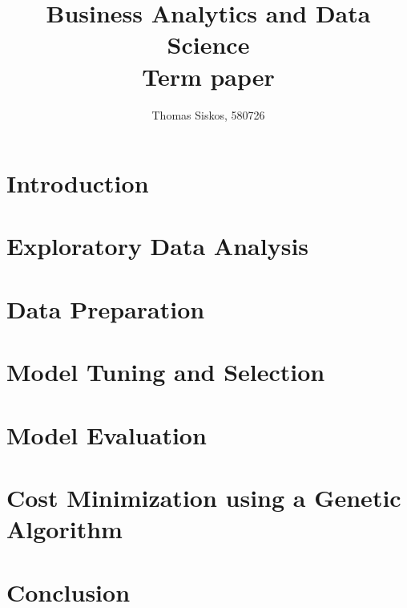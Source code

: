 \documentclass{article}
\begin{document}
\title{Business Analytics and Data Science \\
       \large Term paper}
\author{Thomas Siskos, 580726}

\maketitle

\section{Introduction}
\label{introduction}


\section{Exploratory Data Analysis}
\label{eda}


\section{Data Preparation}
\label{preparation}


\section{Model Tuning and Selection}
\label{tuning}



\section{Model Evaluation}
\label{evaluation}


\section{Cost Minimization using a Genetic Algorithm}
\label{special}


\section{Conclusion}
\label{conclusion}




\end{document}
